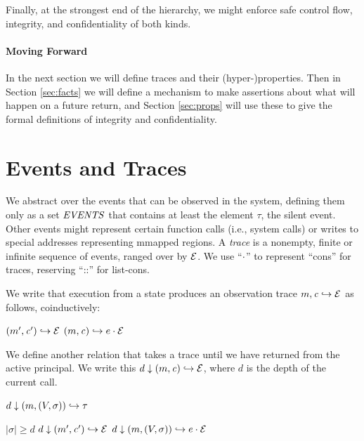 \documentclass[10pt,conference]{ieeetran}%
\theoremstyle{definition}
\begin{document}
Finally, at the strongest end of the hierarchy, we might enforce safe control flow,
integrity, and confidentiality of both kinds.

\paragraph*{Moving Forward}

In the next section we will define traces and their (hyper-)properties.
Then in Section \ref{sec:facts} we will define a mechanism to make assertions
about what will happen on a future return, and Section \ref{sec:props} will use these
to give the formal definitions of integrity and confidentiality.

\section{Events and Traces}
\label{sec:events}

We abstract over the events that can be observed in the system, defining them
only as a set \(\mathit{EVENTS}\) that contains at least the element \(\tau\), the silent
event. Other events might represent certain function calls (i.e., system calls)
or writes to special addresses representing mmapped regions.
A {\em trace} is a nonempty, finite or infinite sequence
of events, ranged over by \(\mathcal{E}\).
We use ``\(\cdot\)'' to represent ``cons'' for traces, reserving ``::''
for list-cons.

We write that execution from a state produces an observation trace
\(m,\mathit{c} \hookrightarrow \mathcal{E}\) as follows, coinductively:

            {\((m',\mathit{c}') \hookrightarrow \mathcal{E}\)}
            {\((m,\mathit{c}) \hookrightarrow e \cdot \mathcal{E}\)}

We define another relation that takes a trace until we have returned from the
active principal.
We write this \(d \downarrow (m,\mathit{c}) \hookrightarrow \mathcal{E}\), where
\(d\) is the depth of the current call.

         {\(d \downarrow (m,(V,\sigma)) \hookrightarrow \tau\)}

                  {\(|\sigma| \geq d\)}
                  {\(d \downarrow (m',\mathit{c}') \hookrightarrow \mathcal{E}\)}
                  {\(d \downarrow (m,(V,\sigma)) \hookrightarrow e \cdot \mathcal{E}\)}
\end{document}
